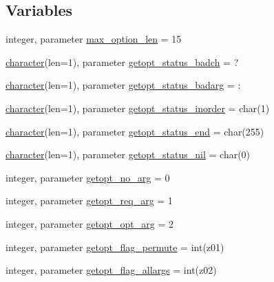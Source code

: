 \subsection*{Variables}
\begin{DoxyCompactItemize}
\item 
integer, parameter \hyperlink{namespacem__getopt__long_aa7e9d6f7c81a30df80cba5f518928d0b}{max\+\_\+option\+\_\+len} = 15
\item 
\hyperlink{option__stopwatch_83_8txt_abd4b21fbbd175834027b5224bfe97e66}{character}(len=1), parameter \hyperlink{namespacem__getopt__long_aaad9b6ad61f0e854d6f5e0be5d6a8391}{getopt\+\_\+status\+\_\+badch} = \textquotesingle{}?\textquotesingle{}
\item 
\hyperlink{option__stopwatch_83_8txt_abd4b21fbbd175834027b5224bfe97e66}{character}(len=1), parameter \hyperlink{namespacem__getopt__long_a0cbf9b0b301392332f65c12012615ed5}{getopt\+\_\+status\+\_\+badarg} = \textquotesingle{}\+:\textquotesingle{}
\item 
\hyperlink{option__stopwatch_83_8txt_abd4b21fbbd175834027b5224bfe97e66}{character}(len=1), parameter \hyperlink{namespacem__getopt__long_ab062153fe30e93d68542fdcb607c84f0}{getopt\+\_\+status\+\_\+inorder} = char(1)
\item 
\hyperlink{option__stopwatch_83_8txt_abd4b21fbbd175834027b5224bfe97e66}{character}(len=1), parameter \hyperlink{namespacem__getopt__long_adb2768994ee191e282dda42a22ded93e}{getopt\+\_\+status\+\_\+end} = char(255)
\item 
\hyperlink{option__stopwatch_83_8txt_abd4b21fbbd175834027b5224bfe97e66}{character}(len=1), parameter \hyperlink{namespacem__getopt__long_a17bc8c03e862e68f855f3c85740fe4c2}{getopt\+\_\+status\+\_\+nil} = char(0)
\item 
integer, parameter \hyperlink{namespacem__getopt__long_a08dabd255fb1dc8cb7aee58aaf55f916}{getopt\+\_\+no\+\_\+arg} = 0
\item 
integer, parameter \hyperlink{namespacem__getopt__long_a52b32d94a183ff13b4a8bf9c14e5634a}{getopt\+\_\+req\+\_\+arg} = 1
\item 
integer, parameter \hyperlink{namespacem__getopt__long_a1750a2d60da545a36608d1d458dd6a89}{getopt\+\_\+opt\+\_\+arg} = 2
\item 
integer, parameter \hyperlink{namespacem__getopt__long_ac2ae1f0969388b7868cb7b070abbff70}{getopt\+\_\+flag\+\_\+permute} = int(z\textquotesingle{}01\textquotesingle{})
\item 
integer, parameter \hyperlink{namespacem__getopt__long_a8e9b76527b39fe8c8311edfb3ca252f3}{getopt\+\_\+flag\+\_\+allargs} = int(z\textquotesingle{}02\textquotesingle{})

\end{DoxyCompactItemize}
